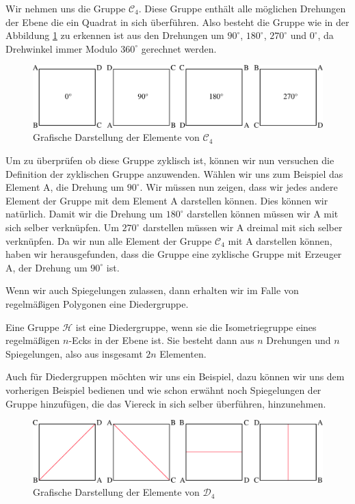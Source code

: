 Wir nehmen uns die Gruppe $\mathcal{C}_4$. Diese Gruppe enthält alle möglichen Drehungen der Ebene die ein Quadrat in sich überführen. Also besteht die Gruppe wie in der Abbildung \ref{fig:zyklische_gruppe_c4} zu erkennen ist aus den Drehungen um $90^{\circ}$, $180^{\circ}$, $270^{\circ}$ und $0^{\circ}$, da Drehwinkel immer Modulo $360^{\circ}$ gerechnet werden.
\begin{figure}[H]
	\centering
	\includegraphics[width=1\linewidth]{grafiken/zyklische_gruppe_c4}
	\caption{Grafische Darstellung der Elemente von $\mathcal{C}_4$}
	\label{fig:zyklische_gruppe_c4}
\end{figure}
Um zu überprüfen ob diese Gruppe zyklisch ist, können wir nun versuchen die Definition der zyklischen Gruppe anzuwenden. Wählen wir uns zum Beispiel das Element A, die Drehung um $90^{\circ}$. Wir müssen nun zeigen, dass wir jedes andere Element der Gruppe mit dem Element A darstellen können. Dies können wir natürlich. Damit wir die Drehung um $180^{\circ}$ darstellen können müssen wir A mit sich selber verknüpfen. Um $270^{\circ}$ darstellen müssen wir A dreimal mit sich selber verknüpfen. Da wir nun alle Element der Gruppe $\mathcal{C}_4$ mit A darstellen können, haben wir herausgefunden, dass die Gruppe eine zyklische Gruppe mit Erzeuger A, der Drehung um $90^{\circ}$ ist. \par\smallskip
Wenn wir auch Spiegelungen zulassen, dann erhalten wir im Falle von regelmäßigen Polygonen eine Diedergruppe.
\begin{defi}[Diedergruppe]
	Eine Gruppe $\mathcal{H}$ ist eine Diedergruppe, wenn sie die Isometriegruppe eines regelmäßigen $n$-Ecks in der Ebene ist. Sie besteht dann aus $n$ Drehungen und $n$ Spiegelungen, also aus insgesamt $2n$ Elementen.
\end{defi}
Auch für Diedergruppen möchten wir uns ein Beispiel, dazu können wir uns dem vorherigen Beispiel bedienen und wie schon erwähnt noch Spiegelungen der Gruppe hinzufügen, die das Viereck in sich selber überführen, hinzunehmen.
\begin{figure}[H]
	\centering
	\includegraphics[width=1\linewidth]{grafiken/dieder_gruppe}
	\caption{Grafische Darstellung der Elemente von $\mathcal{D}_4$}
	\label{fig:zyklische_gruppe_d4}
\end{figure}
